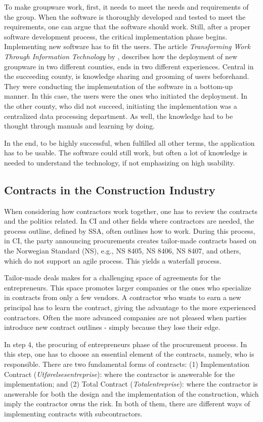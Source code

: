 To make groupware work, first, it needs to meet the needs and requirements of the group. When the software is thoroughly developed and tested to meet the requirements, one can argue that the software should work. Still, after a proper software development process, the critical implementation phase begins. Implementing new software has to fit the users. The article \textit{Transforming Work Through Information Technology} by \cite{Robey&Sahay}, describes how the deployment of new groupware in two different counties, ends in two different experiences. Central in the succeeding county, is knowledge sharing and grooming of users beforehand. They were conducting the implementation of the software in a bottom-up manner. In this case, the users were the ones who initiated the deployment. In the other county, who did not succeed, initiating the implementation was a centralized data processing department. As well, the knowledge had to be thought through manuals and learning by doing.

In the end, to be highly successful, when fulfilled all other terms, the application has to be usable. The software could still work, but often a lot of knowledge is needed to understand the technology, if not emphasizing on high usability. 

\subsection{Contracts in the Construction Industry}
When considering how contractors work together, one has to review the contracts and the politics related. In CI and other fields where contractors are needed, the process outline, defined by SSA, often outlines how to work. During this process, in CI, the party announcing procurements creates tailor-made contracts based on the Norwegian Standard (NS), e.g., NS 8405, NS 8406, NS 8407, and others, which do not support an agile process. This yields a waterfall process. 

Tailor-made deals makes for a challenging space of agreements for the entrepreneurs. This space promotes larger companies or the ones who specialize in contracts from only a few vendors. A contractor who wants to earn a new principal has to learn the contract, giving the advantage to the more experienced contractors. Often the more advanced companies are not pleased when parties introduce new contract outlines - simply because they lose their edge. 

In step 4, the procuring of entrepreneurs phase of the procurement process. In this step, one has to choose an essential element of the contracts, namely, who is responsible. There are two fundamental forms of contracts: (1) Implementation Contract (\textit{Utførelsesentreprise}): where the contractor is answerable for the implementation; and (2) Total Contract (\textit{Totalentreprise}): where the contractor is answerable for both the design and the implementation of the construction, which imply the contractor owns the risk. In both of them, there are different ways of implementing contracts with subcontractors. 

